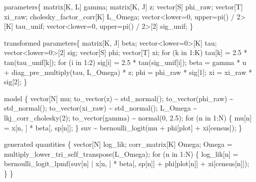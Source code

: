 \documentclass[
  12pt,
  letterpaper,
  DIV=11,
  numbers=noendperiod]{scrartcl}
\newenvironment{Shaded}{\begin{snugshade}}{\end{snugshade}}
\newcommand{\ControlFlowTok}[1]{\textcolor[rgb]{0.00,0.23,0.31}{#1}}
\newcommand{\DataTypeTok}[1]{\textcolor[rgb]{0.68,0.00,0.00}{#1}}
\newcommand{\DecValTok}[1]{\textcolor[rgb]{0.68,0.00,0.00}{#1}}
\newcommand{\FloatTok}[1]{\textcolor[rgb]{0.68,0.00,0.00}{#1}}
\newcommand{\KeywordTok}[1]{\textcolor[rgb]{0.00,0.23,0.31}{#1}}
\newcommand{\NormalTok}[1]{\textcolor[rgb]{0.00,0.23,0.31}{#1}}
\begin{document}
\begin{Shaded}
\begin{Highlighting}[]
\KeywordTok{parameters}\NormalTok{\{}
  \DataTypeTok{matrix}\NormalTok{[K, L] gamma;}
  \DataTypeTok{matrix}\NormalTok{[K, J] z;}
  \DataTypeTok{vector}\NormalTok{[S] phi\_raw;}
  \DataTypeTok{vector}\NormalTok{[T] xi\_raw;}
  \DataTypeTok{cholesky\_factor\_corr}\NormalTok{[K] L\_Omega;}
  \DataTypeTok{vector}\NormalTok{\textless{}}\KeywordTok{lower}\NormalTok{=}\DecValTok{0}\NormalTok{, }\KeywordTok{upper}\NormalTok{=pi() / }\DecValTok{2}\NormalTok{\textgreater{}[K] tau\_unif;}
  \DataTypeTok{vector}\NormalTok{\textless{}}\KeywordTok{lower}\NormalTok{=}\DecValTok{0}\NormalTok{, }\KeywordTok{upper}\NormalTok{=pi() / }\DecValTok{2}\NormalTok{\textgreater{}[}\DecValTok{2}\NormalTok{] sig\_unif;}
\NormalTok{\}}

\KeywordTok{transformed parameters}\NormalTok{\{}
  \DataTypeTok{matrix}\NormalTok{[K, J] beta;}
  \DataTypeTok{vector}\NormalTok{\textless{}}\KeywordTok{lower}\NormalTok{=}\DecValTok{0}\NormalTok{\textgreater{}[K] tau;}
  \DataTypeTok{vector}\NormalTok{\textless{}}\KeywordTok{lower}\NormalTok{=}\DecValTok{0}\NormalTok{\textgreater{}[}\DecValTok{2}\NormalTok{] sig;}
  \DataTypeTok{vector}\NormalTok{[S] phi;}
  \DataTypeTok{vector}\NormalTok{[T] xi;}
  \ControlFlowTok{for}\NormalTok{ (k }\ControlFlowTok{in} \DecValTok{1}\NormalTok{:K) tau[k] = }\FloatTok{2.5}\NormalTok{ * tan(tau\_unif[k]);}
  \ControlFlowTok{for}\NormalTok{ (i }\ControlFlowTok{in} \DecValTok{1}\NormalTok{:}\DecValTok{2}\NormalTok{) sig[i] = }\FloatTok{2.5}\NormalTok{ * tan(sig\_unif[i]);}
\NormalTok{  beta = gamma * u + diag\_pre\_multiply(tau, L\_Omega) * z;}
\NormalTok{  phi = phi\_raw * sig[}\DecValTok{1}\NormalTok{];}
\NormalTok{  xi = xi\_raw * sig[}\DecValTok{2}\NormalTok{];}
\NormalTok{\}}

\KeywordTok{model}\NormalTok{ \{}
  \DataTypeTok{vector}\NormalTok{[N] mu;}
\NormalTok{  to\_vector(z) \textasciitilde{} std\_normal();}
\NormalTok{  to\_vector(phi\_raw) \textasciitilde{} std\_normal();}
\NormalTok{  to\_vector(xi\_raw) \textasciitilde{} std\_normal();}
\NormalTok{  L\_Omega \textasciitilde{} lkj\_corr\_cholesky(}\DecValTok{2}\NormalTok{);}
\NormalTok{  to\_vector(gamma) \textasciitilde{} normal(}\DecValTok{0}\NormalTok{, }\FloatTok{2.5}\NormalTok{);}
  \ControlFlowTok{for}\NormalTok{ (n }\ControlFlowTok{in} \DecValTok{1}\NormalTok{:N) \{}
\NormalTok{    mu[n] = x[n, ] * beta[, sp[n]];}
\NormalTok{  \}}
\NormalTok{  suv \textasciitilde{} bernoulli\_logit(mu + phi[plot] + xi[census]);}
\NormalTok{\}}

\KeywordTok{generated quantities}\NormalTok{ \{}
  \DataTypeTok{vector}\NormalTok{[N] log\_lik;}
  \DataTypeTok{corr\_matrix}\NormalTok{[K] Omega;}
\NormalTok{  Omega = multiply\_lower\_tri\_self\_transpose(L\_Omega);}
  \ControlFlowTok{for}\NormalTok{ (n }\ControlFlowTok{in} \DecValTok{1}\NormalTok{:N) \{}
\NormalTok{    log\_lik[n] = bernoulli\_logit\_lpmf(suv[n] | x[n, ] * beta[, sp[n]] +}
\NormalTok{      phi[plot[n]] + xi[census[n]]);}
\NormalTok{  \}}
\NormalTok{\}}
\end{Highlighting}
\end{Shaded}
\end{document}
